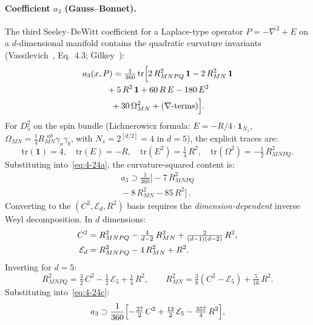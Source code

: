 \paragraph{Coefficient $a_3$ (Gauss--Bonnet).}
The third Seeley--DeWitt coefficient for a Laplace-type operator $P = -\nabla^2 + E$ on a $d$-dimensional manifold contains the quadratic curvature invariants (Vassilevich~\cite{ch4:Vassilevich2003}, Eq.~4.3; Gilkey~\cite{ch4:Gilkey1984}):
\begin{multline}
  a_3(x, P) = \tfrac{1}{360}\, \mathrm{tr}\Bigl[
    2\, R_{MNPQ}^2\, \mathbf{1} - 2\, R_{MN}^2\, \mathbf{1} \\
    {}+ 5\, R^2\, \mathbf{1}
    + 60\, R\, E - 180\, E^2 \\
    {}+ 30\, \Omega_{MN}^2 + (\nabla\text{-terms})
  \Bigr].
  \label{eq:4-24a}
\end{multline}
For $D_5^2$ on the spin bundle (Lichnerowicz formula: $E = -R/4 \cdot \mathbf{1}_{N_s}$, $\Omega_{MN} = \tfrac{1}{4}R_{MN}^{\ \ ab}\gamma_a\gamma_b$, with $N_s = 2^{[d/2]} = 4$ in $d = 5$), the explicit traces are:
\begin{equation}
  \mathrm{tr}(\mathbf{1}) = 4, \quad
  \mathrm{tr}(E) = -R, \quad
  \mathrm{tr}(E^2) = \tfrac{1}{4}\, R^2, \quad
  \mathrm{tr}(\Omega^2) = -\tfrac{1}{2}\, R_{MNPQ}^2.
  \label{eq:4-24b}
\end{equation}
Substituting into~\eqref{eq:4-24a}, the curvature-squared content is:
\begin{multline}
  a_3 \supset \tfrac{1}{360}\bigl[-7\, R_{MNPQ}^2 \\
  {}- 8\, R_{MN}^2 - 85\, R^2\bigr]\,.
  \label{eq:4-24c}
\end{multline}
Converting to the $(C^2, \mathcal{E}_d, R^2)$ basis requires the \emph{dimension-dependent} inverse Weyl decomposition. In $d$ dimensions:
\begin{align}
  C^2 &= R_{MNPQ}^2 - \tfrac{4}{d-2}\,R_{MN}^2 + \tfrac{2}{(d-1)(d-2)}\,R^2, \notag\\
  \mathcal{E}_d &= R_{MNPQ}^2 - 4\,R_{MN}^2 + R^2. \label{eq:4-weyl-decomp}
\end{align}
Inverting for $d = 5$:
\begin{equation}
  R_{MNPQ}^2 = \tfrac{3}{2}\, C^2 - \tfrac{1}{2}\, \mathcal{E}_5 + \tfrac{1}{4}\, R^2, \qquad
  R_{MN}^2 = \tfrac{3}{8}(C^2 - \mathcal{E}_5) + \tfrac{5}{16}\, R^2.
  \label{eq:4-24d-inv}
\end{equation}
Substituting into~\eqref{eq:4-24c}:
\begin{equation}
  a_3 \supset \frac{1}{360}\Bigl[-\tfrac{27}{2}\, C^2 + \tfrac{13}{2}\, \mathcal{E}_5 - \tfrac{357}{4}\, R^2\Bigr],
  \label{eq:4-24d}
\end{equation}
